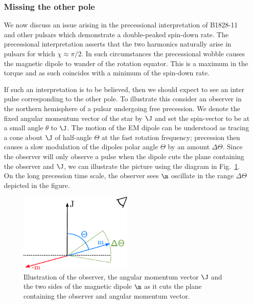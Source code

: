 \documentclass[/home/greg/Thesis/main/main.tex]{subfiles}
\begin{document}
\graphicspath{{/home/greg/Neutron_star_modelling/BeamwidthCalculation/img/}}
\subsubsection{Missing the other pole}
We now discuss an issue arising in the precessional interpretation of B1828-11
and other pulsars which demonstrate a double-peaked spin-down rate. The precessional
interpretation asserts that the two harmonics naturally arise in pulsars
for which $\chi \approx \pi/2$. In such circumstances the precessional wobble
    causes the magnetic dipole to wander of the rotation equator. This is a maximum
    in the torque and as such coincides with a minimum of the spin-down rate.

If such an interpretation is to be believed, then we should expect to see an 
inter pulse corresponding to the other pole. To illustrate this consider an
observer in the northern hemisphere of a pulsar undergoing free precession.
We denote the fixed angular momentum vector of the star by $\J$ and
set the spin-vector to be at a small angle $\theta$ to $\J$. The
motion of the EM dipole can be understood as tracing a cone about $\J$
of half-angle $\Theta$ at the fast rotation frequency; precession then causes
a slow modulation of the dipoles polar angle $\Theta$ by an amount $\Delta\Theta$.  
Since the observer will only observe a pulse when the dipole cuts the plane
containing the observer and $\J$, we can illustrate the picture using
the diagram in Fig.~\ref{fig: dipole close to 90}. On the long precession time
scale, the observer sees $\m$ oscillate in the range $\Delta \Theta$ depicted
in the figure.

\begin{figure}[htb]
\centering
\includegraphics[width=0.5\textwidth]{img/MissingTheOtherPole}
\caption{Illustration of the observer, the angular momentum vector $\J$ and
the two sides of the magnetic dipole $\m$ as it cuts the plane containing
the observer and angular momentum vector.}
\label{fig: dipole close to 90}
\end{figure}
\end{document}
